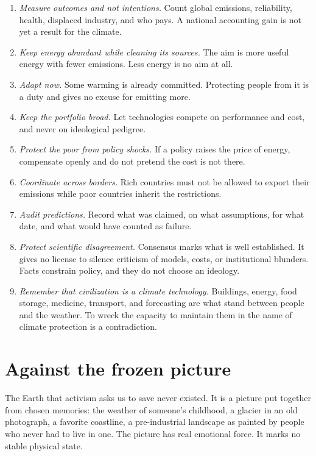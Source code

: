 \documentclass[12pt,a4paper]{book}
\begin{document}
\begin{enumerate}
\item \emph{Measure outcomes and not intentions.} Count global emissions, reliability, health, displaced industry, and who pays. A national accounting gain is not yet a result for the climate.
\item \emph{Keep energy abundant while cleaning its sources.} The aim is more useful energy with fewer emissions. Less energy is no aim at all.
\item \emph{Adapt now.} Some warming is already committed. Protecting people from it is a duty and gives no excuse for emitting more.
\item \emph{Keep the portfolio broad.} Let technologies compete on performance and cost, and never on ideological pedigree.
\item \emph{Protect the poor from policy shocks.} If a policy raises the price of energy, compensate openly and do not pretend the cost is not there.
\item \emph{Coordinate across borders.} Rich countries must not be allowed to export their emissions while poor countries inherit the restrictions.
\item \emph{Audit predictions.} Record what was claimed, on what assumptions, for what date, and what would have counted as failure.
\item \emph{Protect scientific disagreement.} Consensus marks what is well established. It gives no license to silence criticism of models, costs, or institutional blunders. Facts constrain policy, and they do not choose an ideology.
\item \emph{Remember that civilization is a climate technology.} Buildings, energy, food storage, medicine, transport, and forecasting are what stand between people and the weather. To wreck the capacity to maintain them in the name of climate protection is a contradiction.
\end{enumerate}

\section{Against the frozen picture}

The Earth that activism asks us to save never existed. It is a picture put together from chosen memories: the weather of someone's childhood, a glacier in an old photograph, a favorite coastline, a pre-industrial landscape as painted by people who never had to live in one. The picture has real emotional force. It marks no stable physical state.
\end{document}
